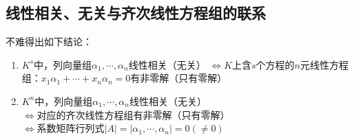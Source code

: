 \subsection*{线性相关、无关与齐次线性方程组的联系}
不难得出如下结论：
\begin{enumerate}
    \item \begin{proposition}
        $K^s$中，列向量组$\alpha_1, \cdots, \alpha_n$线性相关（无关）
        $\Leftrightarrow$$K$上含$s$个方程的$n$元线性方程组：$x_1\alpha_1 + \cdots + x_n\alpha_n=0$有非零解（只有零解）
    \end{proposition}

    \item \begin{proposition}
        $K^n$中，列向量组$\alpha_1, \cdots, \alpha_n$线性相关（无关）\\
        $\Leftrightarrow$对应的齐次线性方程组有非零解（只有零解）\\
        $\Leftrightarrow$系数矩阵行列式$|A| = |\alpha_1, \cdots, \alpha_n| = 0(\neq 0)$
    \end{proposition}
\end{enumerate}